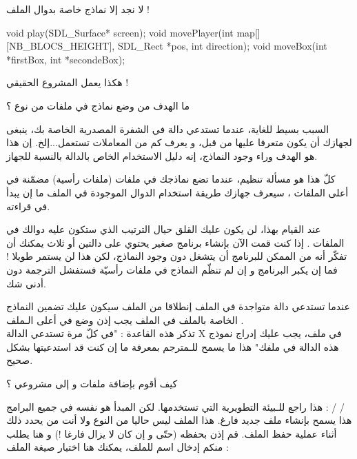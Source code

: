 لا نجد إلا نماذج خاصة بدوال الملف
 !

\begin{Csource}
void play(SDL_Surface* screen);
void movePlayer(int map[][NB_BLOCS_HEIGHT], SDL_Rect *pos, int direction);
void moveBox(int *firstBox, int *secondeBox);
\end{Csource}

هكذا يعمل المشروع الحقيقي !

\begin{question}
  ما الهدف من وضع نماذج في ملفات من نوع
  ؟
\end{question}

السبب بسيط للغاية، عندما تستدعي دالة في الشفرة المصدرية الخاصة بك، ينبغى لجهازك أن يكون متعرفا عليها من قبل، و يعرف كم من المعاملات تستعمل...إلخ. إن هذا هو الهدف وراء وجود النماذج، إنه دليل الاستخدام الخاص بالدالة بالنسبة للجهاز.

كلّ هذا هو مسألة تنظيم، عندما تضع نماذجك في ملفات
(ملفات رأسية) مضمّنة في أعلى الملفات
،
سيعرف جهازك طريقة استخدام الدوال الموجودة في الملف ما إن يبدأ في قراءته.

عند القيام بهذا، لن يكون عليك القلق حيال الترتيب الذي ستكون عليه دوالك في الملفات
.
إذا كنت قمت الآن بإنشاء برنامج صغير يحتوي على دالتين أو ثلاث يمكنك أن تفكّر أنه من الممكن للبرنامج أن يتشغل دون وجود النماذج، لكن هذا لن يستمر طويلا ! فما إن يكبر البرنامج و إن لم تنظّم النماذج في ملفات رأسيّة فستفشل الترجمة دون أدنى شك.

\begin{information}
  عندما تستدعي دالة متواجدة في الملف
  إنطلاقا من الملف
  سيكون عليك تضمين النماذج الخاصة بالملف
  في الملف
  يجب إذن وضع
  في أعلى الـملف
  .\\
  تذكر هذه القاعدة : "في كلّ مرة تستدعي الدالة
  \textenglish{X}
  في ملف، يجب عليك إدراج نموذج هذه الدالة في ملفك" هذا ما يسمح للـمترجم بمعرفة ما إن كنت قد استدعيتها بشكل صحيح.
\end{information}

\begin{question}
  كيف أقوم بإضافة ملفات
 و
 إلى مشروعي ؟
\end{question}

هذا راجع للـبيئة التطويرية التي تستخدمها. لكن المبدأ هو نفسه في جميع البرامج :
 /  / \\
هذا يسمح بإنشاء ملف جديد فارغ. هذا الملف ليس حاليا من النوع
ولا
أنت من يحدد ذلك أثناء عملية حفظ الملف. قم إذن بحفظه (حتّى و إن كان لا يزال فارغا !) و هنا يطلب منكم إدخال اسم للملف، يمكنك هنا اختيار صيغة الملف :

